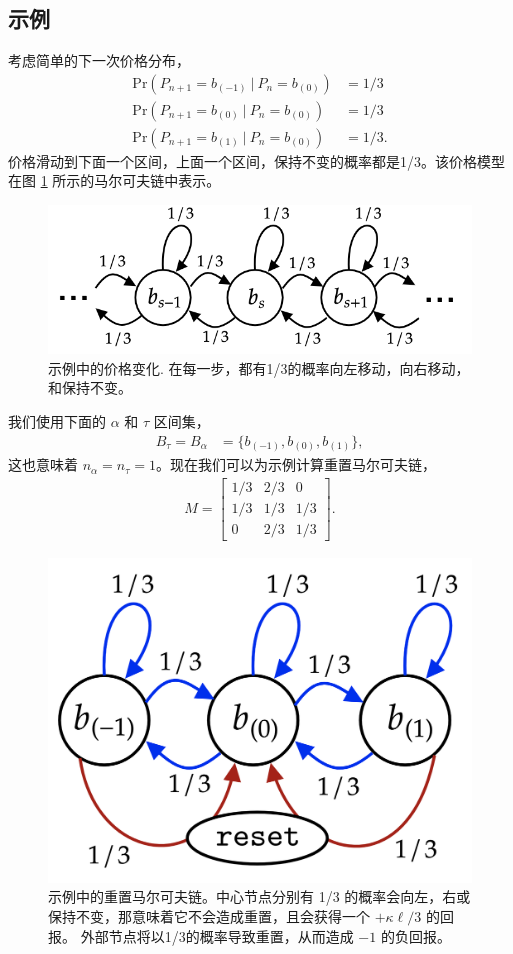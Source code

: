\documentclass[sigconf, dvipsnames]{acmart}
\begin{document}
\subsection{示例}
\quad 考虑简单的下一次价格分布，
\begin{align*}
    \mathrm{Pr}(P_{n+1}= b_{(-1)}~|~P_n = b_{(0)}) &= 1/3\\
    \mathrm{Pr}(P_{n+1}= b_{(0)}~|~P_n = b_{(0)}) &= 1/3 \\
    \mathrm{Pr}(P_{n+1}= b_{(1)}~|~P_n = b_{(0)}) &= 1/3.
\end{align*}
价格滑动到下面一个区间，上面一个区间，保持不变的概率都是1/3。该价格模型在图 \ref{fig:toy_dist} 所示的马尔可夫链中表示。
\begin{figure}
    \centering
    \includegraphics[width=\linewidth]{img/toy_dist.png}
    \caption{示例中的价格变化. 在每一步，都有1/3的概率向左移动，向右移动，和保持不变。
    \label{fig:toy_dist}}
\end{figure}
我们使用下面的 $\alpha$ 和 $\tau$ 区间集，
\begin{align*}
    B_\tau = B_\alpha&=\{b_{(-1)}, b_{(0)}, b_{(1)}\},
\end{align*}
这也意味着 $n_{\alpha} = n_{\tau} = 1$。现在我们可以为示例计算重置马尔可夫链，
\begin{align*}
    M = 
    \begin{bmatrix}
      1/3 & 2/3 & 0 \\
      1/3 & 1/3 & 1/3 \\
      0 & 2/3 & 1/3
    \end{bmatrix}.
\end{align*}
\begin{figure}
    \centering
    \includegraphics[width=0.7\linewidth]{img/toy_markov.png}
    \caption{示例中的重置马尔可夫链。中心节点分别有 1/3 的概率会向左，右或保持不变，那意味着它不会造成重置，且会获得一个 $+\kappa \ell /3$ 的回报。
    外部节点将以1/3的概率导致重置，从而造成 $-1$ 的负回报。
    \label{fig:toy_markov}}
\end{figure}
\end{document}
